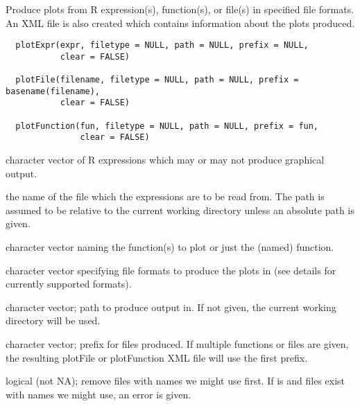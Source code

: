 \documentclass[a4paper,oneside]{report}
\begin{document}
\begin{Description}\relax
Produce plots from R expression(s), function(s), or file(s) in
specified file formats. An XML file is also created which contains
information about the plots produced.
\end{Description}
\begin{Usage}
\begin{verbatim}
  plotExpr(expr, filetype = NULL, path = NULL, prefix = NULL,
           clear = FALSE)

  plotFile(filename, filetype = NULL, path = NULL, prefix = basename(filename),
           clear = FALSE)

  plotFunction(fun, filetype = NULL, path = NULL, prefix = fun,
               clear = FALSE)
\end{verbatim}
\end{Usage}
\begin{Arguments}
\begin{ldescription}
\item[\code{expr}] character vector of R expressions which may or may not
produce graphical output.
\item[\code{filename}] the name of the file which the expressions are to be
read from. The path is assumed to be relative to the
current working directory unless an absolute path is given.
\item[\code{fun}] character vector naming the function(s) to plot or just the
(named) function.
\item[\code{filetype}] character vector specifying file formats to produce the
plots in (see details for currently supported formats).
\item[\code{path}] character vector; path to produce output in. If not given, the
current working directory will be used.
\item[\code{prefix}] character vector; prefix for files produced. If multiple
functions or files are given, the resulting plotFile or plotFunction
XML file will use the first prefix.
\item[\code{clear}] logical (not NA); remove files with names we might use
first. If  is  and files exist
with names we might use, an error is given.
\end{ldescription}
\end{Arguments}
\end{document}
